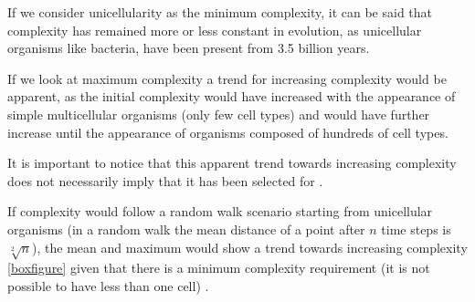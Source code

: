 \begin{mdframed}[style=boxstyle,frametitle={Box1. On the relationship between the increase of complexity in Evolution and Development}]
If we consider unicellularity as the minimum complexity, it can be said that complexity has remained more or less constant in evolution, as unicellular organisms like bacteria, have been present from 3.5 billion years.

If we look at maximum complexity a trend for increasing complexity would be apparent, as the initial complexity would have increased with the appearance of simple multicellular organisms (only few cell types) and would have further increase until the appearance of organisms composed of hundreds of cell types.

It is important to notice that this apparent trend towards increasing complexity does not necessarily imply that it has been selected for \citep{McShea2015}.

If complexity would follow a random walk scenario starting from unicellular organisms (in a random walk the mean distance of a point after $n$ time steps is $\sqrt[2]{n}$), the mean and maximum would show a trend towards increasing complexity \ref{boxfigure} given that there is a minimum complexity requirement (it is not possible to have less than one cell) \citep{gould1996fullhouse}.

\end{mdframed}
